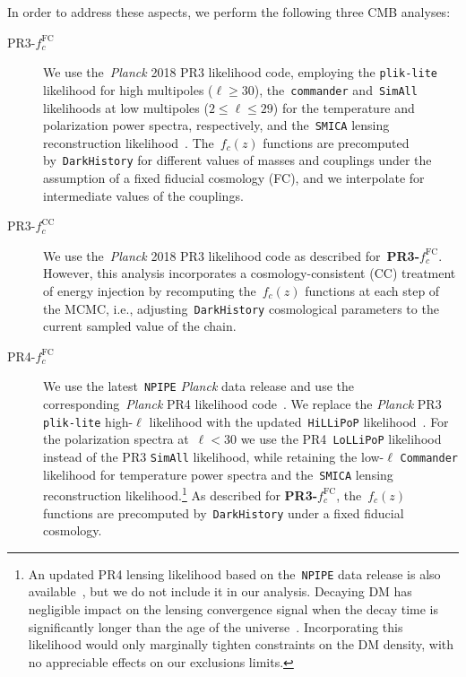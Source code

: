 \documentclass[aps,prd,twocolumn,showpacs,superscriptaddress,nofootinbib,preprintnumbers]{revtex4-2}
\begin{document}
In order to address these aspects, we perform the following three CMB analyses:
\begin{description}
\item[PR3-$f^\mathrm{FC}_c$]
  We use the~\textit{Planck} 2018 PR3 likelihood code, employing the \texttt{plik-lite} likelihood for high multipoles ($\ell \geq 30$), the~\texttt{commander} and~\texttt{SimAll} likelihoods at low multipoles ($2 \leq \ell \leq 29$) for the temperature and polarization power spectra, respectively, and the~\texttt{SMICA} lensing reconstruction likelihood~\cite{Planck:2019nip}.
  The~$f_c(z)$ functions are precomputed by~\texttt{DarkHistory} for different values of masses and couplings under the assumption of a fixed fiducial cosmology (FC), and we interpolate for intermediate values of the couplings.
\item[PR3-$f^\mathrm{CC}_c$]
  We use the~\textit{Planck} 2018 PR3 likelihood code as described for~\textbf{PR3-$f^\mathrm{FC}_c$}.
  However, this analysis incorporates a cosmology-consistent (CC) treatment of energy injection by recomputing the~$f_c(z)$ functions at each step of the MCMC, i.e., adjusting~\texttt{DarkHistory} cosmological parameters to the current sampled value of the chain.
\item[PR4-$f^\mathrm{FC}_c$]
  We use the latest~\texttt{NPIPE} \textit{Planck} data release and use the corresponding~\textit{Planck} PR4 likelihood code~\cite{Planck:2020olo}.
  We replace the \textit{Planck} PR3 \texttt{plik-lite} high-$\ell$ likelihood with the updated~\texttt{HiLLiPoP} likelihood~\cite{Tristram:2023haj}.
  For the polarization spectra at~$\ell < 30$ we use the PR4~\texttt{LoLLiPoP} likelihood~\cite{Tristram:2023haj} instead of the PR3 \texttt{SimAll} likelihood, while retaining the low-$\ell$ \texttt{Commander} likelihood for temperature power spectra and the~\texttt{SMICA} lensing reconstruction likelihood.\footnote{An updated PR4 lensing likelihood based on the~\texttt{NPIPE} data release is also available~\cite{Carron:2022eyg}, but we do not include it in our analysis. Decaying DM has negligible impact on the lensing convergence signal when the decay time is significantly longer than the age of the universe~\cite{Li:2018zdm}. Incorporating this likelihood would only marginally tighten constraints on the DM density, with no appreciable effects on our exclusions limits.}
  As described for \textbf{PR3-$f^\mathrm{FC}_c$}, the~$f_c(z)$ functions are precomputed by~\texttt{DarkHistory} under a fixed fiducial cosmology.
\end{description}
\end{document}
